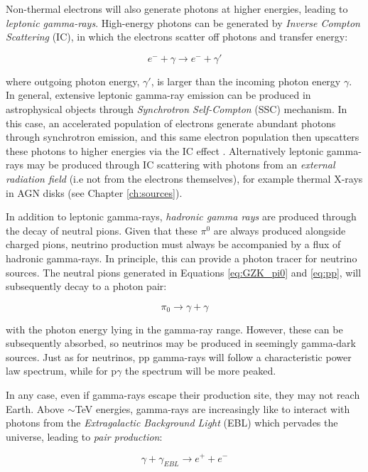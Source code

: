 Non-thermal electrons will also generate photons at higher energies, leading to \emph{leptonic gamma-rays}. High-energy photons can be generated by \emph{Inverse Compton Scattering} (IC), in which the electrons scatter off photons and transfer energy:

\begin{equation}
	e^{-} + \gamma \rightarrow e^{-} + \gamma'
\end{equation}

where outgoing photon energy, $\gamma'$, is larger than the incoming photon energy $\gamma$. In general, extensive leptonic gamma-ray emission can be produced in astrophysical objects through \emph{Synchrotron Self-Compton} (SSC) mechanism. In this case, an accelerated population of electrons generate abundant photons through synchrotron emission, and this same electron population then upscatters these photons to higher energies via the IC effect . Alternatively leptonic gamma-rays may be produced through IC scattering with photons from an \emph{external radiation field} (i.e not from the electrons themselves), for example thermal X-rays in AGN disks (see Chapter \ref{ch:sources}).

In addition to leptonic gamma-rays, \emph{hadronic gamma rays} are produced through the decay of neutral pions. Given that these $\pi^{0}$ are always produced alongside charged pions, neutrino production must always be accompanied by a flux of hadronic gamma-rays. In principle, this can provide a photon tracer for neutrino sources. The neutral pions generated in Equations \ref{eq:GZK_pi0} and \ref{eq:pp}, will subsequently decay to a photon pair:

\begin{equation}
	\pi_{0} \rightarrow \gamma + \gamma
\end{equation}

with the photon energy lying in the gamma-ray range. However, these can be subsequently absorbed, so neutrinos may be produced in seemingly gamma-dark sources. Just as for neutrinos, pp gamma-rays will follow a characteristic power law spectrum, while for p$\gamma$ the spectrum will be more peaked. 

In any case, even if gamma-rays escape their production site, they may not reach Earth. Above $\sim$TeV energies, gamma-rays are increasingly like to interact with photons from the \emph{Extragalactic Background Light} (EBL) which pervades the universe, leading to \emph{pair production}: 

\begin{equation}
	\gamma + \gamma_{EBL} \rightarrow e^{+} + e^{-} 
	\label{eq:gamma_ebl}
\end{equation}

